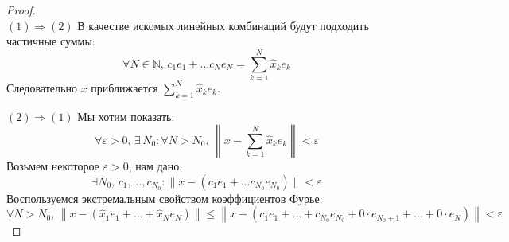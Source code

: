 \documentclass[12pt]{article}
\newcommand{\MN}{\mathbb{N}}
\newcommand{\VE}{\varepsilon}
\theoremstyle{definition}
\newcommand{\ddsum}[2]{\displaystyle\sum\limits_{#1}^{#2}}
\begin{document}
\begin{proof}\hfill\\
	$(1) \Rightarrow (2)$ В качестве искомых линейных комбинаций будут подходить частичные суммы:
	$$
		\forall N \in \MN, \, c_1 e_1 + \dotsc c_N e_N = \ddsum{k = 1}{N}\hat{x}_ke_k
	$$
	Следовательно $x$ приближается $\ddsum{k = 1}{N}\hat{x}_ke_k$.
	
	$(2) \Rightarrow (1)$ Мы хотим показать:
	$$
		\forall \VE > 0, \, \exists \, N_0 \colon \forall N > N_0, \, \left\|x - \ddsum{k = 1}{N}\hat{x}_ke_k\right\| < \VE
	$$
	Возьмем некоторое $\VE > 0$, нам дано:
	$$
		\exists N_0, \, c_1, \dotsc, c_{N_0} \colon \|x - (c_1 e_1 + \dotsc c_{N_0} e_{N_0})\| < \VE
	$$
	Воспользуемся экстремальным свойством коэффициентов Фурье:
	$$
		\forall N > N_0, \, \left\|x - \left(\hat{x}_1 e_1 + \dotsc + \hat{x}_N e_N\right)\right\| \leq \left\|x - \left(c_1 e_1 + \dotsc + c_{N_0} e_{N_0} + 0{\cdot}e_{N_0 + 1} + \dotsc + 0{\cdot}e_{N}\right)\right\| < \VE
	$$
\end{proof}

\newpage
\end{document}
